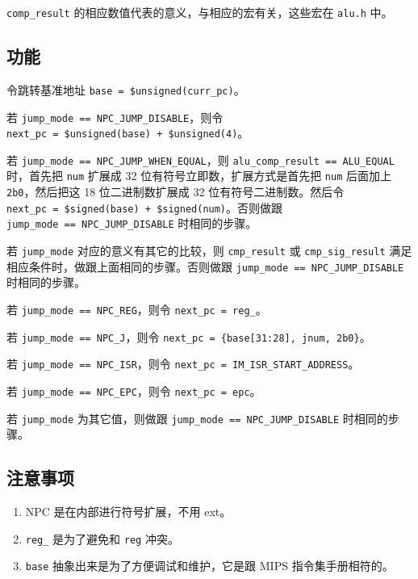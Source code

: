\documentclass[12pt,AutoFakeBold,AutoFakeSlant]{article}
\providecommand{\tightlist}{%
  \setlength{\itemsep}{0pt}\setlength{\parskip}{0pt}}
\begin{document}
\texttt{comp\_result} 的相应数值代表的意义，与相应的宏有关，这些宏在
\texttt{alu.h} 中。

\hypertarget{ux529fux80fd}{%
\subsection{功能}\label{ux529fux80fd}}

令跳转基准地址 \texttt{base\ =\ \$unsigned(curr\_pc)}。

若 \texttt{jump\_mode\ ==\ NPC\_JUMP\_DISABLE}，则令
\texttt{next\_pc\ =\ \$unsigned(base)\ +\ \$unsigned(4)}。

若 \texttt{jump\_mode\ ==\ NPC\_JUMP\_WHEN\_EQUAL}，则
\texttt{alu\_comp\_result\ ==\ ALU\_EQUAL} 时，首先把 \texttt{num}
扩展成 32 位有符号立即数，扩展方式是首先把 \texttt{num} 后面加上
\texttt{2\textquotesingle{}b0}，然后把这 18 位二进制数扩展成 32
位有符号二进制数。然后令
\texttt{next\_pc\ =\ \$signed(base)\ +\ \$signed(num)}。否则做跟
\texttt{jump\_mode\ ==\ NPC\_JUMP\_DISABLE} 时相同的步骤。

若 \texttt{jump\_mode} 对应的意义有其它的比较，则 \texttt{cmp\_result}
或 \texttt{cmp\_sig\_result}
满足相应条件时，做跟上面相同的步骤。否则做跟
\texttt{jump\_mode\ ==\ NPC\_JUMP\_DISABLE} 时相同的步骤。

若 \texttt{jump\_mode\ ==\ NPC\_REG}，则令 \texttt{next\_pc\ =\ reg\_}。

若 \texttt{jump\_mode\ ==\ NPC\_J}，则令
\texttt{next\_pc\ =\ \{base{[}31:28{]},\ jnum,\ 2\textquotesingle{}b0\}}。

若 \texttt{jump\_mode\ ==\ NPC\_ISR}，则令
\texttt{next\_pc\ =\ IM\_ISR\_START\_ADDRESS}。

若 \texttt{jump\_mode\ ==\ NPC\_EPC}，则令 \texttt{next\_pc\ =\ epc}。

若 \texttt{jump\_mode} 为其它值，则做跟
\texttt{jump\_mode\ ==\ NPC\_JUMP\_DISABLE} 时相同的步骤。

\hypertarget{ux6ce8ux610fux4e8bux9879}{%
\subsection{注意事项}\label{ux6ce8ux610fux4e8bux9879}}

\begin{enumerate}
\def\labelenumi{\arabic{enumi}.}
\tightlist
\item
  NPC 是在内部进行符号扩展，不用 ext。
\item
  \texttt{reg\_} 是为了避免和 \texttt{reg} 冲突。
\item
  \texttt{base} 抽象出来是为了方便调试和维护，它是跟 MIPS
  指令集手册相符的。
\end{enumerate}
\end{document}
